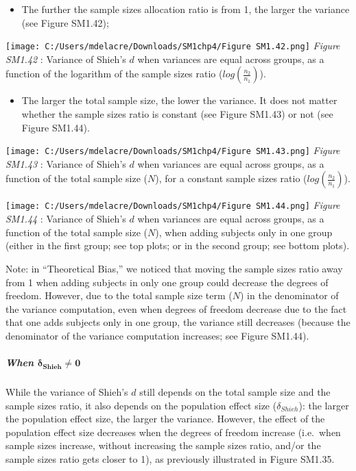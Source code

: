 \documentclass[
  english,
  man,mask,floatsintext]{apa6}
\providecommand{\tightlist}{%
  \setlength{\itemsep}{0pt}\setlength{\parskip}{0pt}}
\let\oldsubparagraph\subparagraph
\renewcommand{\subparagraph}[1]{\oldsubparagraph{#1}\mbox{}}
\begin{document}
\begin{itemize}
\tightlist
\item
  The further the sample sizes allocation ratio is from 1, the larger the variance (see Figure SM1.42);
\end{itemize}

\texttt{[image: C:/Users/mdelacre/Downloads/SM1chp4/Figure SM1.42.png]}
\emph{Figure SM1.42} : Variance of Shieh's \(d\) when variances are equal across groups, as a function of the logarithm of the sample sizes ratio (\(log\left(\frac{n_2}{n_1} \right)\)).

\begin{itemize}
\tightlist
\item
  The larger the total sample size, the lower the variance. It does not matter whether the sample sizes ratio is constant (see Figure SM1.43) or not (see Figure SM1.44).
\end{itemize}

\texttt{[image: C:/Users/mdelacre/Downloads/SM1chp4/Figure SM1.43.png]}
\emph{Figure SM1.43} : Variance of Shieh's \(d\) when variances are equal across groups, as a function of the total sample size (\(N\)), for a constant sample sizes ratio (\(log\left(\frac{n_2}{n_1} \right)\)).

\texttt{[image: C:/Users/mdelacre/Downloads/SM1chp4/Figure SM1.44.png]}
\emph{Figure SM1.44} : Variance of Shieh's \(d\) when variances are equal across groups, as a function of the total sample size (\(N\)), when adding subjects only in one group (either in the first group; see top plots; or in the second group; see bottom plots).

Note: in ``Theoretical Bias,'' we noticed that moving the sample sizes ratio away from 1 when adding subjects in only one group could decrease the degrees of freedom. However, due to the total sample size term (\(N\)) in the denominator of the variance computation, even when degrees of freedom decrease due to the fact that one adds subjects only in one group, the variance still decreases (because the denominator of the variance computation increases; see Figure SM1.44).

\hypertarget{when-bmdelta_shieh-neq-0}{%
\subparagraph{\texorpdfstring{When \(\bm{\delta_{Shieh} \neq 0}\)}{When \textbackslash bm\{\textbackslash delta\_\{Shieh\} \textbackslash neq 0\}}}\label{when-bmdelta_shieh-neq-0}}

While the variance of Shieh's \(d\) still depends on the total sample size and the sample sizes ratio, it also depends on the population effect size (\(\delta_{Shieh}\)): the larger the population effect size, the larger the variance. However, the effect of the population effect size decreases when the degrees of freedom increase (i.e.~when sample sizes increase, without increasing the sample sizes ratio, and/or the sample sizes ratio gets closer to 1), as previously illustrated in Figure SM1.35.
\end{document}
